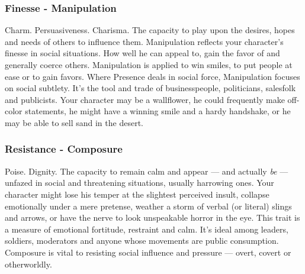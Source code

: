 \documentclass["../Misguided by Starlight.tex"]{subfiles}
\begin{document}
\subsubsection{Finesse - Manipulation}
Charm. Persuasiveness. Charisma. The capacity to play upon the desires, hopes and needs of others to influence them. Manipulation reflects your character's finesse in social situations. How well he can appeal to, gain the favor of and generally coerce others. Manipulation is applied to win smiles, to put people at ease or to gain favors. Where Presence deals in social force, Manipulation focuses on social subtlety. It's the tool and trade of businesspeople, politicians, salesfolk and publicists. Your character may be a wallflower, he could frequently make off-color statements, he might have a winning smile and a hardy handshake, or he may be able to sell sand in the desert.

\subsubsection{Resistance - Composure}
Poise. Dignity. The capacity to remain calm and appear --- and actually \emph{be} --- unfazed in social and threatening situations, usually harrowing ones. Your character might lose his temper at the slightest perceived insult, collapse emotionally under a mere pretense, weather a storm of verbal (or literal) slings and arrows, or have the nerve to look unspeakable horror in the eye. This trait is a measure of emotional fortitude, restraint and calm. It's ideal among leaders, soldiers, moderators and anyone whose movements are public consumption. Composure is vital to resisting social influence and pressure --- overt, covert or otherworldly.
\end{document}
